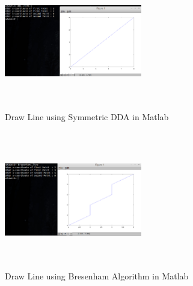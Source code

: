 \begin{figure}[ht!]
\centering
\includegraphics[width=60mm, height=60mm]{line_symmetric_matlab.png}
\caption{Draw Line using Symmetric DDA in  Matlab \label{overflow}}
\end{figure}

\begin{figure}[ht!]
\centering
\includegraphics[width=60mm, height=60mm]{line_bresenham_matlab.png}
\caption{Draw Line using Bresenham Algorithm in  Matlab \label{overflow}}
\end{figure}


